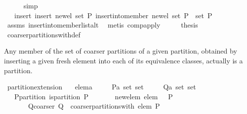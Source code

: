 \begin{isabellebody}
\ \ \ \ \isamarkupfalse%
\ simp\isanewline
\ \ \isamarkupfalse%
\ \isamarkupfalse%
\ {\isachardoublequoteopen}{\isasymdots}\ {\isacharequal}\ insert\ {\isacharparenleft}insert\ {\isacharbraceleft}new{\isacharunderscore}el{\isacharbraceright}\ {\isacharparenleft}set\ P{\isacharparenright}{\isacharparenright}\ {\isacharparenleft}{\isacharparenleft}insert{\isacharunderscore}into{\isacharunderscore}member\ new{\isacharunderscore}el\ {\isacharparenleft}set\ P{\isacharparenright}{\isacharparenright}\ {\isacharbackquote}\ set\ P{\isacharparenright}{\isachardoublequoteclose}\isanewline
\ \ \ \ \isamarkupfalse%
\ assms\ insert{\isacharunderscore}into{\isacharunderscore}member{\isacharunderscore}list{\isacharunderscore}alt\ \isamarkupfalse%
\ {\isacharparenleft}metis\ comp{\isacharunderscore}apply{\isacharparenright}\isanewline
\ \ \isamarkupfalse%
\ \isamarkupfalse%
\ {\isacharquery}thesis\ \isamarkupfalse%
\ coarser{\isacharunderscore}partitions{\isacharunderscore}with{\isacharunderscore}def\ \isacommand{{\isachardot}}\isamarkupfalse%
\isanewline
{}\isamarkupfalse%
%
\endisatagproof
{\isafoldproof}%
%
\isadelimproof
%
\endisadelimproof
%
\begin{isamarkuptext}%
Any member of the set of coarser partitions of a given partition, obtained by inserting 
  a given fresh element into each of its equivalence classes, actually is a partition.%
\end{isamarkuptext}%
\isamarkuptrue%
\isamarkupfalse%
\ partition{\isacharunderscore}extension{}{\isacharcolon}\isanewline
\ \ \ elem{\isacharcolon}{\isacharcolon}{\isacharprime}a\isanewline
\ \ \ \ \ P{\isacharcolon}{\isacharcolon}{\isachardoublequoteopen}{\isacharprime}a\ set\ set{\isachardoublequoteclose}\isanewline
\ \ \ \ \ Q{\isacharcolon}{\isacharcolon}{\isachardoublequoteopen}{\isacharprime}a\ set\ set{\isachardoublequoteclose}\isanewline
\ \ \ P{\isacharunderscore}partition{\isacharcolon}\ {\isachardoublequoteopen}is{\isacharunderscore}partition\ P{\isachardoublequoteclose}\isanewline
\ \ \ \ \ \ \ new{\isacharunderscore}elem{\isacharcolon}\ {\isachardoublequoteopen}elem\ {\isasymnotin}\ {\isasymUnion}\ P{\isachardoublequoteclose}\isanewline
\ \ \ \ \ \ \ Q{\isacharunderscore}coarser{\isacharcolon}\ {\isachardoublequoteopen}Q\ {\isasymin}\ coarser{\isacharunderscore}partitions{\isacharunderscore}with\ elem\ P{\isachardoublequoteclose}\isanewline

\end{isabellebody}
